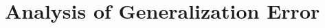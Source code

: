 \documentclass[a4paper,11pt]{article}
\begin{document}

\section{Analysis of Generalization Error}
\end{document}
